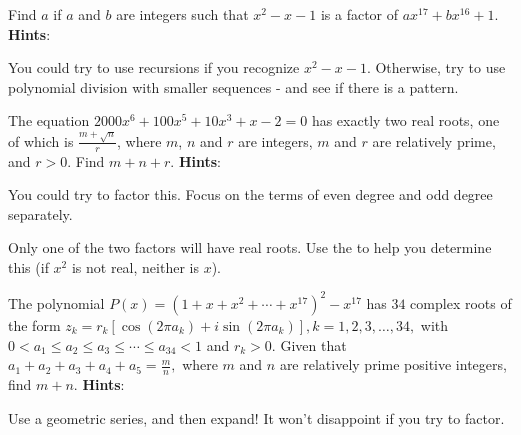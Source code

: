\documentclass[11pt,titlepage]{scrartcl}
\newenvironment{hint}{\footnotesize \normalfont \textbf{Hints}:}{\hspace{-0.5ex}}
\begin{document}
\begin{problem}
Find $a$ if $a$ and $b$ are integers such that $x^2 - x - 1$ is a factor of $ax^{17} + bx^{16} + 1$.
\begin{hint}
\begin{addhint}{
You could try to use recursions if you recognize $x^2-x-1$. Otherwise, try to use polynomial division with smaller sequences - and see if there is a pattern.
}\end{addhint}
\end{hint}
\end{problem}
\begin{problem}
The equation $2000x^6+100x^5+10x^3+x-2=0$ has exactly two real roots, one of which is $\frac{m+\sqrt{n}}r$, where $m$, $n$ and $r$ are integers, $m$ and $r$ are relatively prime, and $r>0$. Find $m+n+r$.
\begin{hint}
\begin{addhint}{
You could try to factor this. Focus on the terms of even degree and odd degree separately.
}\end{addhint}
\begin{addhint}{
Only one of the two factors will have real roots. Use the  to help you determine this (if $x^2$ is not real, neither is $x$).
}\end{addhint}
\end{hint}
\end{problem}
\begin{problem}
The polynomial $P(x)=(1+x+x^2+\cdots+x^{17})^2-x^{17}$ has $34$ complex roots of the form $z_k = r_k[\cos(2\pi a_k)+i\sin(2\pi a_k)], k=1, 2, 3,\ldots, 34,$ with $0 < a_1 \le a_2 \le a_3 \le \cdots \le a_{34} < 1$ and $r_k>0.$ Given that $a_1 + a_2 + a_3 + a_4 + a_5 = \frac mn,$ where $m$ and $n$ are relatively prime positive integers, find $m+n.$
\begin{hint}
\begin{addhint}{
Use a geometric series, and then expand! It won't disappoint if you try to factor.
}\end{addhint}
\end{hint}
\end{problem}
\end{document}
